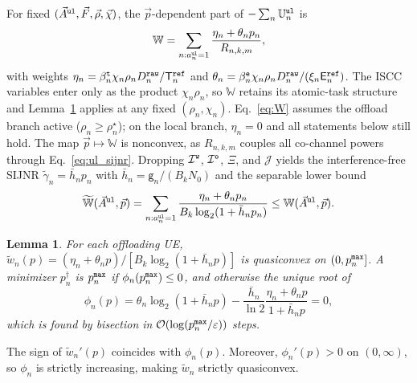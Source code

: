 \documentclass[journal]{IEEEtran}
\newtheorem{lemma}{Lemma}
\begin{document}
For fixed $(\vec{A}^{\tt ul},\vec{F},\vec{\rho},\vec{\chi})$, the $\vec{p}$-dependent part of $-\sum_n\mathbb{U}_n^{\tt ul}$ is
\begin{equation}
\mathbb{W}=\sum_{n:a_n^{\tt ul}=1}\frac{\eta_n+\theta_n p_n}{R_{n,k,m}},
\label{eq:W}
\end{equation}
with weights $\eta_n=\beta_n^{\tt t}\chi_n\rho_n D_n^{\tt raw}/\mathsf{T}_n^{\tt ref}$ and $\theta_n=\beta_n^{\tt e}\chi_n\rho_n D_n^{\tt raw}/(\xi_n\mathsf{E}_n^{\tt ref})$. The ISCC variables enter only as the product $\chi_n\rho_n$, so $\mathbb{W}$ retains its atomic-task structure and Lemma~\ref{lem:quasi} applies at any fixed $(\rho_n,\chi_n)$. Eq.~\eqref{eq:W} assumes the offload branch active ($\rho_n\ge\rho_n^\star$); on the local branch, $\eta_n=0$ and all statements below still hold.
The map $\vec{p}\mapsto\mathbb{W}$ is nonconvex, as $R_{n,k,m}$ couples all co-channel powers through Eq.~\eqref{eq:ul_sijnr}. Dropping $\mathcal{I}^{\tt w}$, $\mathcal{I}^{\tt o}$, $\Xi$, and $\mathcal{J}$ yields the interference-free SIJNR $\tilde\gamma_{n}= \bar h_n p_n$ with $\bar h_n=\mathsf{g}_n/(B_k N_0)$ and the separable lower bound
\begin{equation}
\widetilde{\mathbb{W}}(\vec{A}^{\tt ul},\vec{p})
=\sum_{n:a_n^{\tt ul}=1}
\frac{\eta_n+\theta_n p_n}{B_k\log_2(1+\bar h_n p_n)}
\le \mathbb{W}(\vec{A}^{\tt ul},\vec{p}).
\label{eq:Wtil}
\end{equation}

\begin{lemma}\label{lem:quasi}
For each offloading UE, ${\tilde{w}}_n(p)=(\eta_n+\theta_n p)/[B_k\log_2(1+\bar h_n p)]$ is quasiconvex on $(0,p_n^{\tt max}]$. A minimizer $p_n^\dagger$ is $p_n^{\tt max}$ if $\phi_n(p_n^{\tt max})\le 0$, and otherwise the unique root of
\begin{equation}
\phi_n(p)
=\theta_n\log_2(1+\bar h_n p)
-\frac{\bar h_n}{\ln 2}\frac{\eta_n+\theta_n p}{1+\bar h_n p}=0,
\label{eq:phi}
\end{equation}
which is found by bisection in $\mathcal{O}(\log(p_n^{\tt max}/\varepsilon))$ steps.
\end{lemma}
\begin{IEEEproof}
The sign of $\tilde{w}_n'(p)$ coincides with $\phi_n(p)$. 
{Moreover, $\phi_n'(p)>0$ on $(0,\infty)$, so $\phi_n$ is strictly increasing, making $\tilde{w}_n$ strictly quasiconvex.}
\end{IEEEproof}
\end{document}
